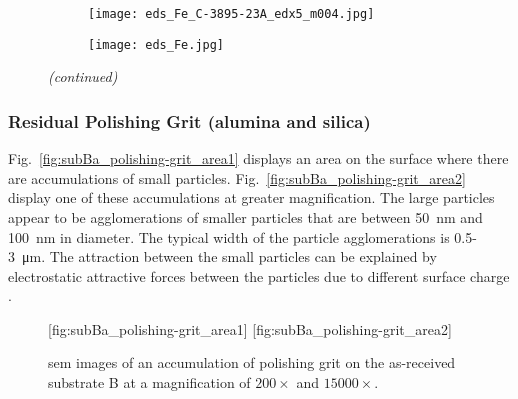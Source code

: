 %
\begin{figure}[htbp]
\ContinuedFloat
    \centering
    \begin{subfigure}[t]{\textwidth}
    \caption{}\label{fig:subBa_partice_Fe}
          \begin{minipage}[t]{0.43\linewidth}
            \centering
            \texttt{[image: eds\_Fe\_C-3895-23A\_edx5\_m004.jpg]}
          \end{minipage}
          \hfill
          \begin{minipage}[t]{0.43\linewidth}
            \centering
            \texttt{[image: eds\_Fe.jpg]}
          \end{minipage}
          \begin{minipage}[t]{0.11\linewidth}
            \centering
            \atomicTable[&][&][&]
          \end{minipage}
    \end{subfigure}%
    \captionsetup{list=no}
    \caption{\emph{(continued)}}
\end{figure}

\subsubsection{Residual Polishing Grit (alumina and silica)}
Fig.~\ref{fig:subBa_polishing-grit_area1} displays an area on the surface where there are accumulations of small particles. Fig.~\ref{fig:subBa_polishing-grit_area2} display one of these accumulations at greater magnification. The large particles appear to be agglomerations of smaller particles that are between \SI{50}{\nano\metre} and \SI{100}{\nano\metre} in diameter. The typical width of the particle agglomerations is \SI{0.5}{}-\SI{3}{\micro\metre}. The attraction between the small particles can be explained by electrostatic attractive forces between the particles due to different surface charge \citep{allen2001review}.

\begin{figure}[htbp]
    \centering
        [fig:subBa_polishing-grit_area1]
        \hfill
        [fig:subBa_polishing-grit_area2]
    \caption[\Ac{sem} images of an accumulaton of polishing grit on substrate B.]{\Ac{sem} images of an accumulation of polishing grit on the as-received substrate B at a magnification of  $200\times$ and  $15000\times$.}\label{fig:subBa_polishing-grit_area}
\end{figure}


